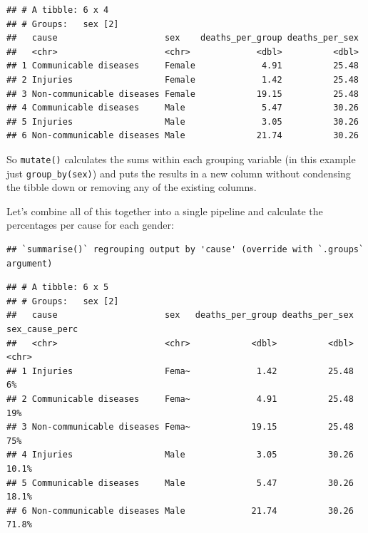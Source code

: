 \documentclass[
  12pt,
  krantz2]{krantz}
\makeatletter
\newenvironment{Shaded}{\begin{snugshade}}{\end{snugshade}}
\newcommand{\DataTypeTok}[1]{\textcolor[rgb]{0.13,0.29,0.53}{#1}}
\newcommand{\KeywordTok}[1]{\textcolor[rgb]{0.13,0.29,0.53}{\textbf{#1}}}
\newcommand{\NormalTok}[1]{#1}
\newcommand{\OperatorTok}[1]{\textcolor[rgb]{0.81,0.36,0.00}{\textbf{#1}}}
\newcommand{\StringTok}[1]{\textcolor[rgb]{0.31,0.60,0.02}{#1}}
\newenvironment{kframe}{%
\medskip{}
\setlength{\fboxsep}{.8em}
 \def\at@end@of@kframe{}%
 \ifinner\ifhmode%
  \def\at@end@of@kframe{\end{minipage}}%
  \begin{minipage}{\columnwidth}%
 \fi\fi%
 \def\FrameCommand##1{\hskip\@totalleftmargin \hskip-\fboxsep
 \colorbox{shadecolor}{##1}\hskip-\fboxsep
     \hskip-\linewidth \hskip-\@totalleftmargin \hskip\columnwidth}%
 \MakeFramed {\advance\hsize-\width
   \@totalleftmargin\z@ \linewidth\hsize
   \@setminipage}}%
 {\par\unskip\endMakeFramed%
 \at@end@of@kframe}
\renewenvironment{Shaded}{\begin{kframe}}{\end{kframe}}
\makeatother
\begin{document}
\begin{verbatim}
## # A tibble: 6 x 4
## # Groups:   sex [2]
##   cause                     sex    deaths_per_group deaths_per_sex
##   <chr>                     <chr>             <dbl>          <dbl>
## 1 Communicable diseases     Female             4.91          25.48
## 2 Injuries                  Female             1.42          25.48
## 3 Non-communicable diseases Female            19.15          25.48
## 4 Communicable diseases     Male               5.47          30.26
## 5 Injuries                  Male               3.05          30.26
## 6 Non-communicable diseases Male              21.74          30.26
\end{verbatim}

So \texttt{mutate()} calculates the sums within each grouping variable (in this example just \texttt{group\_by(sex)}) and puts the results in a new column without condensing the tibble down or removing any of the existing columns.

Let's combine all of this together into a single pipeline and calculate the percentages per cause for each gender:

\begin{Shaded}
\end{Shaded}

\begin{verbatim}
## `summarise()` regrouping output by 'cause' (override with `.groups` argument)
\end{verbatim}

\begin{verbatim}
## # A tibble: 6 x 5
## # Groups:   sex [2]
##   cause                     sex   deaths_per_group deaths_per_sex sex_cause_perc
##   <chr>                     <chr>            <dbl>          <dbl> <chr>         
## 1 Injuries                  Fema~             1.42          25.48 6%            
## 2 Communicable diseases     Fema~             4.91          25.48 19%           
## 3 Non-communicable diseases Fema~            19.15          25.48 75%           
## 4 Injuries                  Male              3.05          30.26 10.1%         
## 5 Communicable diseases     Male              5.47          30.26 18.1%         
## 6 Non-communicable diseases Male             21.74          30.26 71.8%
\end{verbatim}
\end{document}
